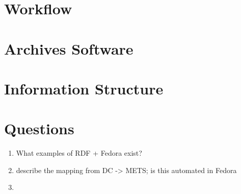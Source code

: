 \documentclass[oneside]{article}
\begin{document}
\section{Workflow}


\section{Archives Software}


\section{Information Structure}


\section{Questions}
\begin{enumerate}
  \item{What examples of RDF + Fedora exist?}
  \item{describe the mapping from DC -> METS; is this automated in Fedora}
  \item{}
\end{enumerate}


\end{document}
